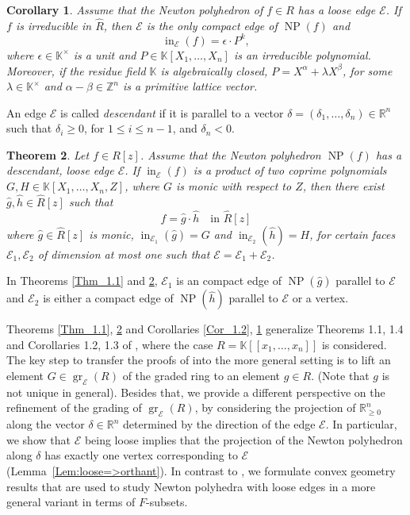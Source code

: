 \documentclass[11pt]{amsart}
\theoremstyle{plain}
\newtheorem{Thm}{Theorem}[section]
\newtheorem{Cor}[Thm]{Corollary}
\theoremstyle{definition}
\numberwithin{equation}{section}
\newcommand{\gr}{\operatorname{gr}}
\newcommand{\ini}{\operatorname{in}}
\newcommand{\NP}{\operatorname{NP}}
\renewcommand{\a}{\alpha}
\renewcommand{\b}{\beta}
\renewcommand{\d}{\delta}
\renewcommand{\l}{\lambda}
\newcommand{\KK}{{\mathbb K}}
\newcommand{\RR}{\mathbb R}
\newcommand{\ZZ}{{\mathbb Z}}
\newcommand{\cE}{\mathcal{E}}
\newcommand{\Edge}{\cE}
\newcommand{\gqz}{{\geq 0}}
\renewcommand{\(}{(\!(}
\renewcommand{\)}{)\!)}
\begin{document}
\begin{Cor}
	\label{Cor_1.3}
	Assume that the Newton polyhedron of $ f \in R $ has a loose edge $ \cE $.
	If $ f $ is irreducible in $ \widehat R $, then $ \cE $ is the only compact edge of $ \NP(f) $ and 
	\[
		\ini_\cE (f) = \epsilon \cdot  P^k,
	\] 
	where $ \epsilon \in \KK^\times $ is a unit and 
	$ P \in \KK[X_1, \ldots, X_n] $ is an irreducible polynomial.
	Moreover, if the residue field $ \KK $ is algebraically closed, $ P = X^\a +  \l X^\b  $, for some $ \l \in \KK^\times $ and $ \a - \b \in \ZZ^n $ is a primitive lattice vector.
\end{Cor}


An edge $ \Edge $ is called {\em descendant} if it is parallel to a vector $ \d = (\d_1, \ldots, \d_n ) \in \RR^n $ such that
$ \d_i \geq 0 $, for $  1 \leq i \leq n - 1 $, and 
$ \d_n < 0 $.

\begin{Thm}
	\label{Thm_1.4}
	Let $ f \in R[z] $.
	Assume that the Newton polyhedron $ \NP(f) $ has a descendant, loose edge $ \cE $.
	If $ \ini_\cE (f) $ is a product of two coprime polynomials $ G, H  \in \KK[X_1, \ldots, X_n, Z]$,
	where $ G $ is monic with respect to $ Z $,
	then there exist $ \widehat g, \widehat  h \in \widehat R [z] $ such that
	\[
		f = \widehat g \cdot \widehat h \ \ \ \mbox{ in } \widehat R[z]
	\]
	where $ \widehat  g \in \widehat R [z] $ is monic, 
	$ \ini_{\cE_1} (\widehat g) = G $ and $ \ini_{\cE_2} (\widehat h) = H $,
	 for certain faces $ \cE_1, \cE_2 $ of dimension at most one such that $ \cE= \cE_1 + \cE_2 $. 
\end{Thm}

In Theorems \ref{Thm_1.1} and \ref{Thm_1.4}, 
$ \cE_1 $ is an compact edge of $ \NP(\widehat g) $ parallel to $ \cE $
and $ \cE_2 $ is either a compact edge of $ \NP(\widehat h) $ 
parallel to $ \cE$ or a vertex.  



Theorems \ref{Thm_1.1}, \ref{Thm_1.4} and Corollaries \ref{Cor_1.2}, \ref{Cor_1.3} 
generalize Theorems 1.1, 1.4 and Corollaries 1.2, 1.3 of \cite{GH},
where the case $ R = \KK[[x_1, \ldots, x_n]] $ is considered.
%
The key step to transfer the proofs of \cite{GH} into the more general setting is to lift an element $ G \in \gr_\cE (R) $ of the graded ring to an element $ g \in R $. 
(Note that $ g $ is not unique in general).
Besides that, we provide a different perspective on the refinement of the grading of $ \gr_\cE(R) $, by considering the projection of $ \RR^n_\gqz $ along the vector $ \d \in \RR^n $ determined by the direction of the edge $ \cE$.
In particular, we show that $ \cE $ being loose implies that the projection of the Newton polyhedron along $ \d $ has exactly one vertex corresponding to $ \cE $ (Lemma~\ref{Lem:loose=>orthant}).
In contrast to \cite{GH}, we formulate convex geometry results that are used to study Newton polyhedra with loose edges in a more general variant in terms of $ F $-subsets.   
\end{document}
